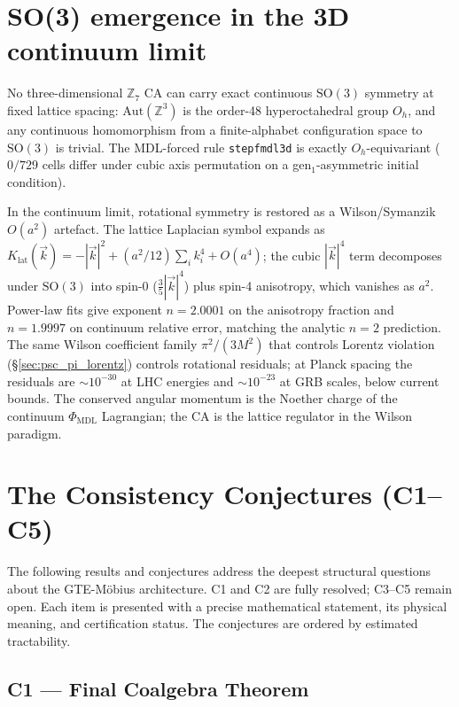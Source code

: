 \documentclass[12pt,letterpaper]{article}
\newcommand{\Zseven}{\mathbb{Z}_7}
\newcommand{\lean}[1]{%
  \penalty-100
  \begingroup\def\_{\textunderscore\allowbreak}\texttt{#1}\endgroup}
\begin{document}
\section{\texorpdfstring{SO(3)}{SO(3)} emergence in the 3D continuum limit}
\label{sec:so3_emergence}

No three-dimensional $\Zseven$ CA can carry exact continuous $\mathrm{SO}(3)$ symmetry at
fixed lattice spacing: $\mathrm{Aut}(\mathbb{Z}^3)$ is the order-48 hyperoctahedral group
$O_h$, and any continuous homomorphism from a finite-alphabet configuration space to
$\mathrm{SO}(3)$ is trivial.
The MDL-forced rule \lean{step\_fmdl3d} is exactly $O_h$-equivariant
($0/729$ cells differ under cubic axis permutation on a gen$_1$-asymmetric initial condition).

In the continuum limit, rotational symmetry is restored as a Wilson/Symanzik
$O(a^2)$ artefact.
The lattice Laplacian symbol expands as
$K_{\mathrm{lat}}(\vec{k}) = -|\vec{k}|^2 + (a^2/12)\sum_i k_i^4 + O(a^4)$;
the cubic $|\vec{k}|^4$ term decomposes under $\mathrm{SO}(3)$ into spin-0
($\tfrac{3}{5}|\vec{k}|^4$) plus spin-4 anisotropy, which vanishes as $a^2$.
Power-law fits give exponent $n = 2.0001$ on the anisotropy fraction and
$n = 1.9997$ on continuum relative error, matching the analytic $n=2$ prediction.
The same Wilson coefficient family $\pi^2/(3M^2)$ that controls Lorentz violation
(\S\ref{sec:psc_pi_lorentz}) controls rotational residuals; at Planck spacing the
residuals are $\sim 10^{-30}$ at LHC energies and $\sim 10^{-23}$ at GRB scales,
below current bounds.
The conserved angular momentum is the Noether charge of the continuum
$\Phi_{\mathrm{MDL}}$ Lagrangian; the CA is the lattice regulator in the Wilson paradigm.

\section{The Consistency Conjectures (C1--C5)}
\label{sec:conjectures}

The following results and conjectures address the deepest structural questions about
the GTE-M\"{o}bius architecture.  C1 and C2 are fully resolved; C3--C5 remain
open.  Each item is presented with a precise mathematical statement, its physical
meaning, and certification status.  The conjectures are ordered by estimated
tractability.

\subsection{C1 --- Final Coalgebra Theorem}
\label{sec:C1}
\end{document}
